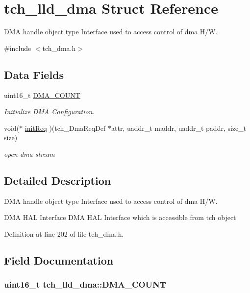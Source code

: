 \hypertarget{structtch__lld__dma}{\section{tch\+\_\+lld\+\_\+dma Struct Reference}
\label{structtch__lld__dma}
}


D\+M\+A handle object type Interface used to access control of dma H/\+W.  




{\ttfamily \#include $<$tch\+\_\+dma.\+h$>$}

\subsection*{Data Fields}
\begin{DoxyCompactItemize}
\item 
uint16\+\_\+t \hyperlink{structtch__lld__dma_acd1164e06ba97a863404bba6c8b9130c}{D\+M\+A\+\_\+\+C\+O\+U\+N\+T}
\begin{DoxyCompactList}\small\item\em Initialize D\+M\+A Configuration. \end{DoxyCompactList}\item 
void($\ast$ \hyperlink{structtch__lld__dma_a5e96ed20c8ad8154cde020e449e52b34}{init\+Req} )(tch\+\_\+\+Dma\+Req\+Def $\ast$attr, uaddr\+\_\+t maddr, uaddr\+\_\+t paddr, size\+\_\+t size)
\begin{DoxyCompactList}\small\item\em open dma stream \end{DoxyCompactList}\end{DoxyCompactItemize}


\subsection{Detailed Description}
D\+M\+A handle object type Interface used to access control of dma H/\+W. 

D\+M\+A H\+A\+L Interface D\+M\+A H\+A\+L Interface which is accessible from tch object 

Definition at line 202 of file tch\+\_\+dma.\+h.



\subsection{Field Documentation}
\hypertarget{structtch__lld__dma_acd1164e06ba97a863404bba6c8b9130c}{
\subsubsection[{D\+M\+A\+\_\+\+C\+O\+U\+N\+T}]{\setlength{\rightskip}{0pt plus 5cm}uint16\+\_\+t tch\+\_\+lld\+\_\+dma\+::\+D\+M\+A\+\_\+\+C\+O\+U\+N\+T}}\label{structtch__lld__dma_acd1164e06ba97a863404bba6c8b9130c}


